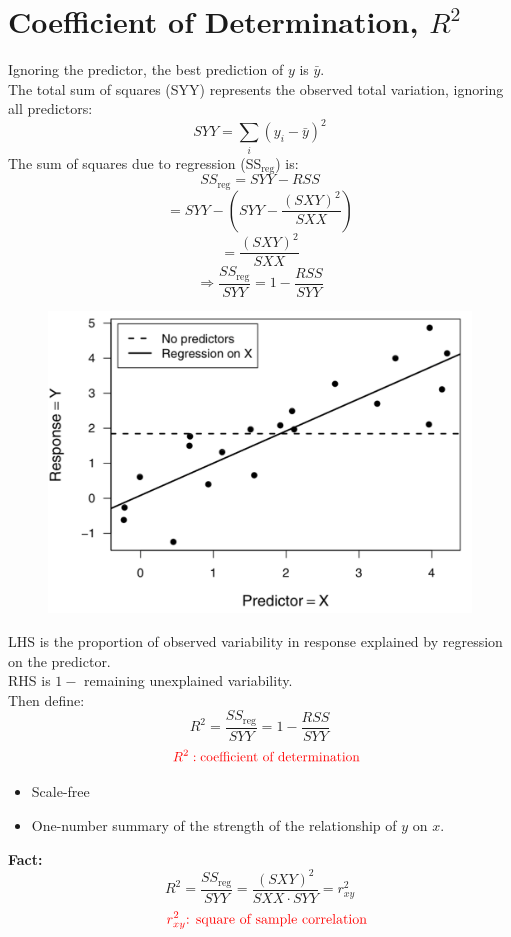 \documentclass[14pt]{extarticle}
\begin{document}
\section*{Coefficient of Determination, $R^2$}
\noindent
Ignoring the predictor, the best prediction of $y$ is $\bar{y}$.\\
The total sum of squares (SYY) represents the observed total variation, ignoring all predictors:
\[
SYY = \sum_i (y_i - \bar{y})^2
\]
The sum of squares due to regression (SS$_{\text{reg}}$) is:
\[
SS_{\text{reg}} = SYY - RSS
\]
\[
= SYY - \left(SYY - \frac{(SXY)^2}{SXX}\right)
\]
\[
= \frac{(SXY)^2}{SXX}
\]
\[
\Rightarrow \frac{SS_{\text{reg}}}{SYY} = 1 - \frac{RSS}{SYY}
\]
\begin{figure}[H]
    \centering
    \includegraphics[width=1\textwidth]{fig9.png}
\end{figure}
\noindent
LHS is the proportion of observed variability in response explained by regression on the predictor.\\
RHS is $1 - $ remaining unexplained variability.\\
Then define:
\[
R^2 = \frac{SS_{\text{reg}}}{SYY} = 1 - \frac{RSS}{SYY}
\]
\[
\textcolor{red}{\quad R^2 :  \text{coefficient of determination}}
\]
\begin{itemize}
    \item Scale-free
    \item One-number summary of the strength of the relationship of $y$ on $x$.
\end{itemize}
\textbf{Fact: }
\[
R^2 = \frac{SS_{\text{reg}}}{SYY} = \frac{(SXY)^2}{SXX \cdot SYY} = r_{xy}^2
\]
\[
\textcolor{red}{\quad r_{xy}^2 \text{: square of sample correlation}}
\]
\end{document}
